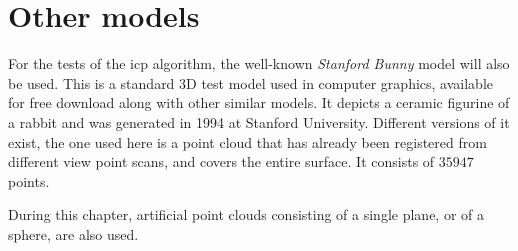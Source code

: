 \section{Other models}
For the tests of the \gls{icp} algorithm, the well-known \emph{Stanford Bunny} model will also be used. This is a standard 3D test model used in computer graphics, available for free download along with other similar models. It depicts a ceramic figurine of a rabbit and was generated in 1994 at Stanford University. Different versions of it exist, the one used here is a point cloud that has already been registered from different view point scans, and covers the entire surface. It consists of $35947$ points.

During this chapter, artificial point clouds consisting of a single plane, or of a sphere, are also used.
